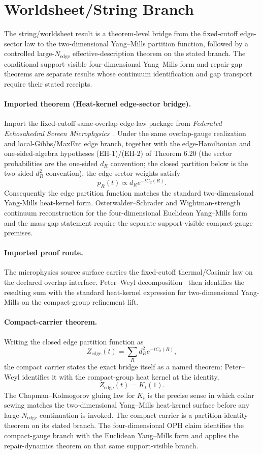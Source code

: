 \section{Worldsheet/String Branch}

The string/worldsheet result is a theorem-level bridge from the fixed-cutoff edge-sector law to
the two-dimensional Yang--Mills partition function, followed by a controlled large-\(N_{\mathrm{edge}}\)
effective-description theorem on the stated branch. The conditional
support-visible four-dimensional Yang--Mills form and repair-gap theorems are
separate results whose continuum identification and gap transport require
their stated receipts.

\paragraph{Imported theorem (Heat-kernel edge-sector bridge).}
Import the fixed-cutoff same-overlap edge-law package from
\emph{Federated Echosahedral Screen Microphysics}~\cite{ophmicrophysics}.
Under the same overlap-gauge realization and local-Gibbs/MaxEnt edge branch, together with the
edge-Hamiltonian and one-sided-algebra hypotheses (EH-1)/(EH-2) of Theorem 6.20 (the sector
probabilities are the one-sided \(d_R\) convention; the closed partition below is the two-sided
\(d_R^2\) convention), the edge-sector weights satisfy
\[
p_R(t)\propto d_R e^{-t C_2(R)}.
\]
Consequently the edge partition function matches the standard two-dimensional Yang-Mills
heat-kernel form. Osterwalder--Schrader and Wightman-strength continuum
reconstruction for the four-dimensional Euclidean Yang--Mills form and the
mass-gap statement require the separate support-visible compact-gauge
premises.

\paragraph{Imported proof route.}
The microphysics source surface carries the fixed-cutoff thermal/Casimir law on the declared
overlap interface. Peter--Weyl decomposition~\cite{peterWeyl27}
then identifies the resulting sum with the standard heat-kernel expression for
two-dimensional Yang-Mills on the compact-group refinement lift.

\paragraph{Compact-carrier theorem.}
Writing the closed edge partition function as
\[
Z_{\mathrm{edge}}(t)=\sum_R d_R^2 e^{-tC_2(R)},
\]
the compact carrier states the exact bridge itself as a named theorem: Peter--Weyl identifies it with the compact-group heat kernel at the identity,
\[
Z_{\mathrm{edge}}(t)=K_t(1).
\]
The Chapman--Kolmogorov gluing law for \(K_t\) is the precise sense in which collar sewing
matches the two-dimensional Yang--Mills heat-kernel surface before any large-\(N_{\mathrm{edge}}\)
continuation is invoked.
The compact carrier is a partition-identity theorem on its stated branch. The four-dimensional OPH
claim identifies the compact-gauge branch with the Euclidean Yang--Mills form and applies the
repair-dynamics theorem on that same support-visible branch.

